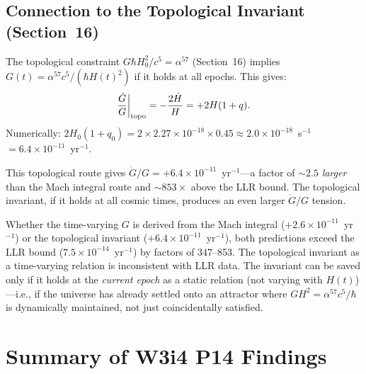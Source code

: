 \documentclass[11pt]{article}
\newcommand{\ee}[1]{\times 10^{#1}}
\begin{document}
\subsection{Connection to the Topological Invariant (Section~16)}

The topological constraint $G\hbar H_0^2/c^5 = \alpha^{57}$ (Section~16)
implies $G(t) = \alpha^{57}c^5/(\hbar H(t)^2)$ if it holds at all epochs.
This gives:
\begin{equation}
\frac{\dot{G}}{G}\bigg|_{\rm topo} = -\frac{2\dot{H}}{H} = +2H(1+q).
\label{eq:Gdot-topo}
\end{equation}
Numerically: $2H_0(1+q_0) = 2\times2.27\ee{-18}\times0.45 \approx 2.0\ee{-18}$~s$^{-1}$
$= 6.4\ee{-11}$~yr$^{-1}$.

This topological route gives $\dot{G}/G = +6.4\ee{-11}$~yr$^{-1}$---a factor of
$\sim 2.5$ \emph{larger} than the Mach integral route and $\sim 853\times$
above the LLR bound. The topological invariant, if it holds at all cosmic times,
produces an even larger $\dot{G}/G$ tension.

\begin{tcolorbox}[colback=red!5!white, colframe=red!60!black,
  title=\textbf{Both Routes to $\dot{G}/G$ Are Excluded by LLR}]
Whether the time-varying $G$ is derived from the Mach integral ($+2.6\ee{-11}$~yr$^{-1}$)
or the topological invariant ($+6.4\ee{-11}$~yr$^{-1}$), both predictions
exceed the LLR bound ($7.5\ee{-14}$~yr$^{-1}$) by factors of 347--853.
The topological invariant as a time-varying relation is inconsistent with
LLR data. The invariant can be saved only if it holds at the \emph{current
epoch} as a static relation (not varying with $H(t)$)---i.e., if the
universe has already settled onto an attractor where $GH^2 = \alpha^{57}c^5/\hbar$
is dynamically maintained, not just coincidentally satisfied.
\end{tcolorbox}

\section{Summary of W3i4 P14 Findings}
\label{sec:summary}
\end{document}
